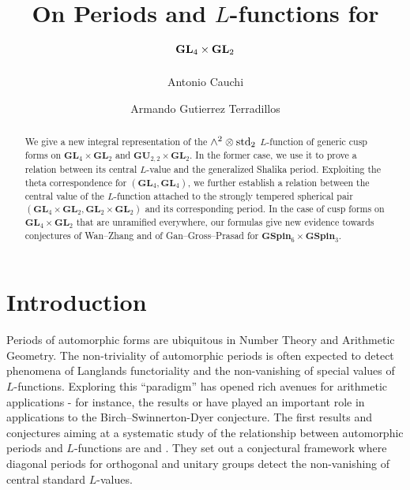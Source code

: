 \documentclass[11pt, reqno]{amsart}
\title{On Periods and $L$-functions for $\GL_4 \times \GL_2$}
\author{Antonio Cauchi}
\author{Armando Gutierrez Terradillos}
\theoremstyle{plain}
\theoremstyle{definition}
\theoremstyle{remark}
\theoremstyle{plain}
\def\GU{{\mathbf{GU}}}
\def\GSpin{{\mathbf{GSpin}}}
\def\GL{\mathbf{GL}}
\begin{document}

\begin{abstract}
We give a new integral representation of the $\wedge^2  \otimes {\rm std}_2$ $L$-function of generic cusp forms on $\GL_4 \times \GL_2$ and $\GU_{2,2}\times \GL_2$. In the former case, we use it to prove a relation between its central $L$-value and the generalized Shalika period. Exploiting the theta correspondence for $(\GL_4,\GL_4)$, we further establish a relation between the central value of the $L$-function attached to the strongly tempered spherical pair $(\GL_4 \times \GL_2,\GL_2 \times \GL_2)$ and its corresponding period. In the case of cusp forms on $\GL_4 \times \GL_2$ that are unramified everywhere, our formulas give new evidence towards conjectures of Wan--Zhang and of Gan--Gross--Prasad for $\GSpin_6 \times \GSpin_3$. \end{abstract}

\maketitle
{}


\setcounter{tocdepth}{1}
\tableofcontents
 
\section{Introduction}


Periods of automorphic forms are ubiquitous in Number Theory and Arithmetic Geometry. The non-triviality of automorphic periods is often expected to detect phenomena of Langlands functoriality and the non-vanishing of special values of $L$-functions. Exploring this ``paradigm''  has opened rich avenues for arithmetic applications - for instance, the results \cite{WaldsToricPeriods} or \cite{IchinoTriple} have played an important role in applications to the Birch--Swinnerton-Dyer conjecture. The first results and conjectures aiming at a systematic study of the relationship between automorphic periods and $L$-functions are \cite{GrossPrasadFirst} and \cite{GGPOriginal}. They set out a conjectural framework where diagonal periods for orthogonal and unitary groups detect the non-vanishing of central standard $L$-values. 
\end{document}
